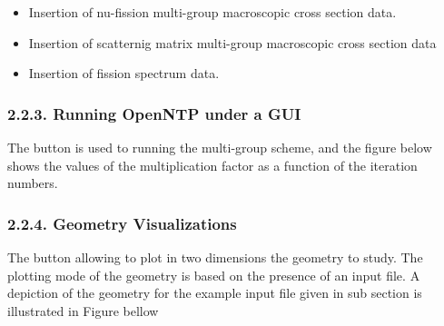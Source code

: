 \documentclass[letterpaper,10pt,english]{sphinxmanual}
\begin{document}
\noindent{}
\begin{itemize}
\item {} 
Insertion of nu-fission  multi-group macroscopic cross section data.

\end{itemize}

\noindent{}
\begin{itemize}
\item {} 
Insertion of scatternig matrix multi-group macroscopic cross section data

\end{itemize}

\noindent{}
\begin{itemize}
\item {} 
Insertion of fission spectrum data.

\end{itemize}

\noindent{}


\subsubsection{2.2.3. Running OpenNTP under a GUI}
\label{\detokenize{Guide:running-openntp-under-a-gui}}
The  button is used to running the multi-group scheme, and the figure below shows the values of the multiplication factor as a function of the iteration numbers.

\noindent{}


\subsubsection{2.2.4. Geometry Visualizations}
\label{\detokenize{Guide:geometry-visualizations}}
The  button allowing to plot in two dimensions the geometry to study. The plotting mode of the geometry is based on the presence of an input file. A depiction of the geometry for the example input file given in sub section  is illustrated in Figure bellow

\noindent{}
\end{document}

